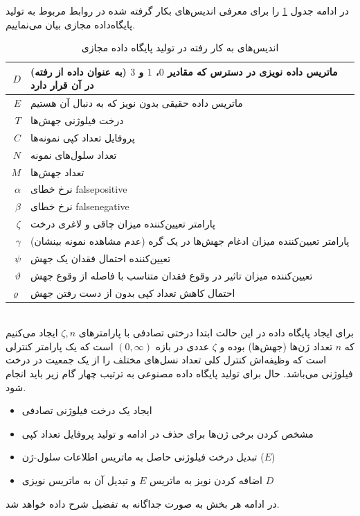 در ادامه جدول
\ref{tab:ch_er:datasetIndices}
را برای معرفی اندیس‌های بکار گرفته شده در روابط مربوط به تولید پایگاه‌داده مجازی بیان می‌نماییم.
\begin{table}[ht]
	\caption{اندیس‌های به کار رفته در تولید پایگاه داده مجازی}
	\label{tab:ch_er:datasetIndices}
	\centering
	\onehalfspacing
	\begin{tabularx}{0.9\textwidth}{|r|X|}
		\hline
		$D$	& ماتریس داده نویزی در دسترس که مقادیر $0$، $1$ و $3$ (به عنوان داده از رفته) در آن قرار دارد \\
		\hline
		$E$	& ماتریس داده حقیقی بدون نویز که به دنبال آن هستیم \\
		\hline
		$T$	& درخت فیلوژنی جهش‌ها \\
		\hline
		$C$ & پروفایل تعداد کپی نمونه‌ها \\
		\hline
		$N$	& تعداد سلول‌های نمونه \\
		\hline
		$M$	& تعداد جهش‌ها \\
		\hline
		$\alpha$ & نرخ خطای \gls{falsepositive} \\
		\hline
		$\beta$	& نرخ خطای \gls{falsenegative} \\
		\hline
		$\zeta$ & پارامتر تعیین‌کننده میزان چاقی و لاغری درخت‌ \\
		\hline
		$\gamma$ & پارامتر تعیین‌کننده میزان ادغام جهش‌ها در یک گره (عدم مشاهده نمونه بینشان) \\
		\hline
		$\psi$ & تعیین‌کننده احتمال فقدان یک جهش \\
		\hline
		$\vartheta$ & تعیین‌کننده میزان تاثیر در وقوع فقدان متناسب با فاصله از وقوع جهش \\
		\hline
		$\varrho$	& احتمال کاهش تعداد کپی بدون از دست رفتن جهش \\
		\hline
	\end{tabularx}
\end{table}
\\
برای ایجاد پایگاه داده در این حالت ابتدا درختی تصادفی با پارامترهای $\zeta, n$ ایجاد می‌کنیم که $n$ تعداد ژن‌ها (جهش‌ها) بوده و $\zeta$ عددی در بازه $(0, \infty)$ است که یک پارامتر کنترلی است که وظیفه‌اش کنترل کلی تعداد نسل‌های مختلف را از یک جمعیت در درخت فیلوژنی می‌باشد.
حال برای تولید پایگاه داده مصنوعی به ترتیب چهار گام زیر باید انجام شود.
\begin{itemize}
	\item ایجاد یک درخت فیلوژنی تصادفی
	\item مشخص کردن برخی ژن‌ها برای حذف در ادامه و تولید پروفایل تعداد کپی
	\item تبدیل درخت فیلوژنی حاصل به ماتریس اطلاعات سلول-ژن ($E$)
	\item اضافه کردن نویز به ماتریس $E$ و تبدیل آن به ماتریس نویزی $D$
\end{itemize}
در ادامه هر بخش به صورت جداگانه به تفضیل شرح داده خواهد شد.

